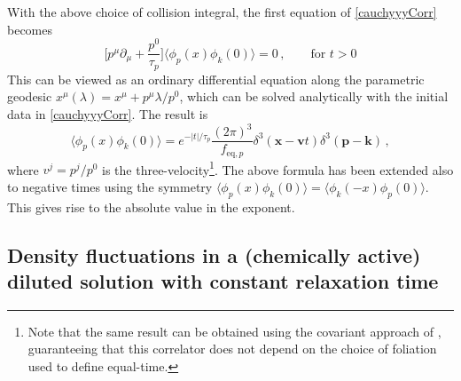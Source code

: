 \documentclass[aps,prd,preprint,nofootinbib,amsmath,amssymb,showpacs,longbibliography,singlecolumn,superscriptaddress,10pt]{revtex4-1}
\theoremstyle{plain}
\theoremstyle{definition}
\begin{document}
With the above choice of collision integral, the first equation of \eqref{cauchyyyCorr} becomes
\begin{equation}\label{unpodilavoro2}
    \bigg[ p^\mu \partial_\mu+ \dfrac{p^0}{\tau_p} \bigg] \langle \phi_p(x)\phi_k(0) \rangle= 0 \, , \quad \quad \text{for }t>0
\end{equation}
This can be viewed as an ordinary differential equation along the parametric geodesic $x^\mu(\lambda)=x^\mu+p^\mu \lambda/p^0$, which can be solved analytically with the initial data in \eqref{cauchyyyCorr}. The result is
\begin{equation}\label{quinquin}
    \langle \phi_p(x)\phi_k(0) \rangle=e^{-|t|/\tau_p} \dfrac{(2\pi)^3}{f_{\text{eq},p}}\delta^3(\textbf{x}-\textbf{v}t)\delta^3(\textbf{p}-\textbf{k}) \, ,
\end{equation}
where $v^j=p^j/p^0$ is the three-velocity\footnote{Note that the same result can be obtained using the covariant approach of \cite{Mullins:2023tjg, Mullins:2023ott}, guaranteeing that this correlator does not depend on the choice of foliation used to define equal-time.}. The above formula has been extended also to negative times using the symmetry $\langle \phi_p(x)\phi_k(0) \rangle=\langle \phi_k(-x)\phi_p(0) \rangle$. This gives rise to the absolute value in the exponent.

\subsection{Density fluctuations in a (chemically active) diluted solution with constant relaxation time}
\end{document}
